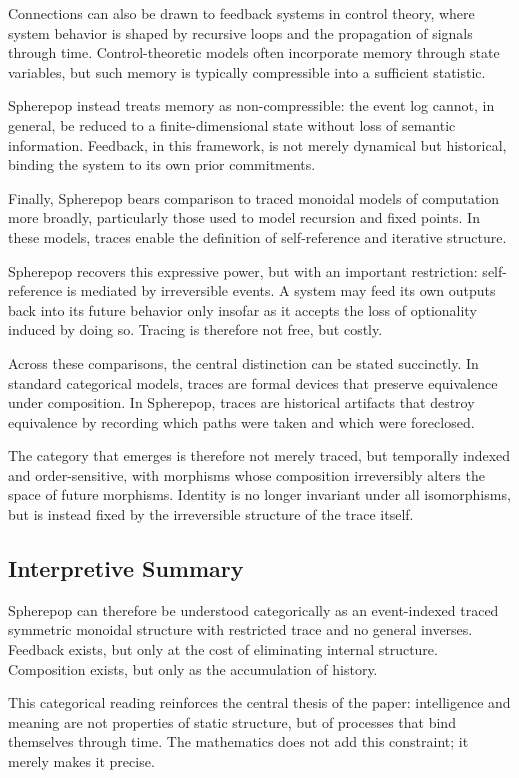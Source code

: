 \documentclass[11pt]{article}
\begin{document}
Connections can also be drawn to feedback systems in control theory, where system behavior is shaped by recursive loops and the propagation of signals through time. Control-theoretic models often incorporate memory through state variables, but such memory is typically compressible into a sufficient statistic.

Spherepop instead treats memory as non-compressible: the event log cannot, in general, be reduced to a finite-dimensional state without loss of semantic information. Feedback, in this framework, is not merely dynamical but historical, binding the system to its own prior commitments.

Finally, Spherepop bears comparison to traced monoidal models of computation more broadly, particularly those used to model recursion and fixed points. In these models, traces enable the definition of self-reference and iterative structure.

Spherepop recovers this expressive power, but with an important restriction: self-reference is mediated by irreversible events. A system may feed its own outputs back into its future behavior only insofar as it accepts the loss of optionality induced by doing so. Tracing is therefore not free, but costly.

Across these comparisons, the central distinction can be stated succinctly. In standard categorical models, traces are formal devices that preserve equivalence under composition. In Spherepop, traces are historical artifacts that destroy equivalence by recording which paths were taken and which were foreclosed. 

The category that emerges is therefore not merely traced, but temporally indexed and order-sensitive, with morphisms whose composition irreversibly alters the space of future morphisms. Identity is no longer invariant under all isomorphisms, but is instead fixed by the irreversible structure of the trace itself.

\subsection{Interpretive Summary}

Spherepop can therefore be understood categorically as an event-indexed traced symmetric monoidal structure with restricted trace and no general inverses. Feedback exists, but only at the cost of eliminating internal structure. Composition exists, but only as the accumulation of history.

This categorical reading reinforces the central thesis of the paper: intelligence and meaning are not properties of static structure, but of processes that bind themselves through time. The mathematics does not add this constraint; it merely makes it precise.
\end{document}
